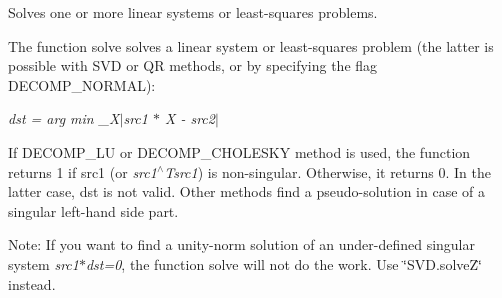 Solves one or more linear systems or least-\/squares problems.

The function {\ttfamily solve} solves a linear system or least-\/squares problem (the latter is possible with S\+VD or QR methods, or by specifying the flag {\ttfamily D\+E\+C\+O\+M\+P\+\_\+\+N\+O\+R\+M\+AL})\+:

{\itshape dst = arg min \+\_\+\+X$\vert$src1 $\ast$ X -\/ src2$\vert$}

If {\ttfamily D\+E\+C\+O\+M\+P\+\_\+\+LU} or {\ttfamily D\+E\+C\+O\+M\+P\+\_\+\+C\+H\+O\+L\+E\+S\+KY} method is used, the function returns 1 if {\ttfamily src1} (or {\itshape src1$^\wedge$\+Tsrc1}) is non-\/singular. Otherwise, it returns 0. In the latter case, {\ttfamily dst} is not valid. Other methods find a pseudo-\/solution in case of a singular left-\/hand side part.

Note\+: If you want to find a unity-\/norm solution of an under-\/defined singular system {\itshape src1$\ast$dst=0}, the function {\ttfamily solve} will not do the work. Use \char`\"{}\+S\+V\+D.\+solve\+Z\char`\"{} instead.


